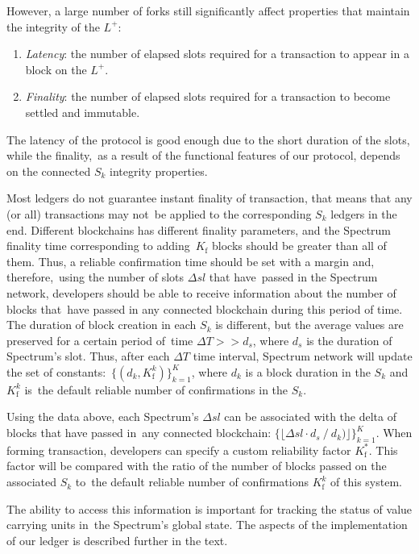 However, a large number of forks still significantly affect properties that maintain the integrity of the $L^+$:
\begin{enumerate}
    \item \textit{Latency}: the number of elapsed slots required for a transaction to appear in a block on the $L^+$.
    \item \textit{Finality}: the number of elapsed slots required for a transaction to become settled and immutable.
\end{enumerate}
The latency of the protocol is good enough due to the short duration of the slots, while the finality,\
as a result of the functional features of our protocol, depends on the connected $S_k$ integrity properties.

Most ledgers do not guarantee instant finality of transaction, that means that any (or all) transactions may not\
be applied to the corresponding $S_k$ ledgers in the end.
Different blockchains has different finality parameters, and the Spectrum finality time corresponding to adding\
$K_{\text{f}}$ blocks should be greater than all of them.
Thus, a reliable confirmation time should be set with a margin and, therefore,\
using the number of slots $\Delta sl$ that have\
passed in the Spectrum network, developers should be able to receive information about the number of blocks that\
have passed in any connected blockchain during this period of time.
The duration of block creation in each $S_k$ is different, but the average values are preserved for a certain period of\
time ${\Delta T >> d_s}$, where $d_s$ is the duration of Spectrum's slot.
Thus, after each $\Delta T$ time interval, Spectrum network will update the set of constants:\
${\{(d_k, K^k_{\text{f}})\}_{k=1}^{K}}$, where $d_k$ is a block duration in the $S_k$ and $K^k_{\text{f}}$ is\
the default reliable number of confirmations in the $S_k$.

Using the data above, each Spectrum's $\Delta sl$ can be associated with the delta of blocks that have passed in\
any connected blockchain: ${\{\lfloor \Delta sl \cdot d_s \mathbin{/} d_k)\rfloor\}_{k=1}^{K}}$.
When forming transaction, developers can specify a custom reliability factor $K^*_{\text{f}}$.
This factor will be compared with the ratio of the number of blocks passed on the associated $S_k$ to\
the default reliable number of confirmations $K^k_{\text{f}}$ of this system.

The ability to access this information is important for tracking the status of value carrying units in\
the Spectrum's global state.
The aspects of the implementation of our ledger is described further in the text.



